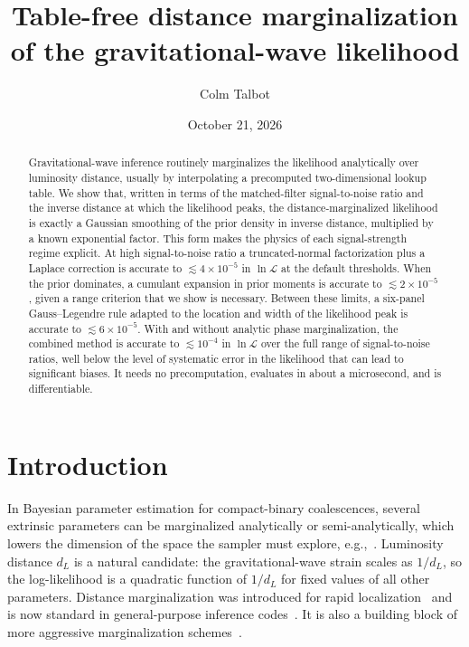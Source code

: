 \documentclass[prd,twocolumn,nofootinbib,superscriptaddress,amsmath,amssymb]{revtex4-2}
\begin{document}
\title{Table-free distance marginalization of the gravitational-wave likelihood}

\author{Colm Talbot}

\date{October 21,
2026}

\begin{abstract}
Gravitational-wave inference routinely marginalizes the likelihood analytically over luminosity distance,
usually by interpolating a precomputed two-dimensional lookup table.
We show that,
written in terms of the matched-filter signal-to-noise ratio and the inverse distance at which the likelihood peaks,
the distance-marginalized likelihood is exactly a Gaussian smoothing of the prior density in inverse distance,
multiplied by a known exponential factor.
This form makes the physics of each signal-strength regime explicit.
At high signal-to-noise ratio a truncated-normal factorization plus a Laplace correction is accurate to $\lesssim 4\times10^{-5}$ in $\ln\mathcal{L}$ at the default thresholds.
When the prior dominates,
a cumulant expansion in prior moments is accurate to $\lesssim 2\times10^{-5}$,
given a range criterion that we show is necessary.
Between these limits,
a six-panel Gauss--Legendre rule adapted to the location and width of the likelihood peak is accurate to $\lesssim 6\times10^{-5}$.
With and without analytic phase marginalization,
the combined method is accurate to $\lesssim 10^{-4}$ in $\ln\mathcal{L}$ over the full range of signal-to-noise ratios,
well below the level of systematic error in the likelihood that can lead to significant biases.
It needs no precomputation,
evaluates in about a microsecond,
and is differentiable.
\end{abstract}

\maketitle

\section{Introduction}

In Bayesian parameter estimation for compact-binary coalescences,
several extrinsic parameters can be marginalized analytically or semi-analytically,
which lowers the dimension of the space the sampler must explore, e.g.,~\cite{Thrane2019}.
Luminosity distance $d_L$ is a natural candidate: the gravitational-wave strain scales as $1/d_L$,
so the log-likelihood is a quadratic function of $1/d_L$ for fixed values of all other parameters.
Distance marginalization was introduced for rapid localization~\cite{Singer2016a,Singer2016b} and is now standard in general-purpose inference codes~\cite{Thrane2019,Ashton2019,RomeroShaw2020}.
It is also a building block of more aggressive marginalization schemes~\cite{Pankow2015,Lange2018,Roulet2024}.
\end{document}
